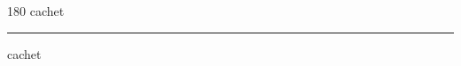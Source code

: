 
\begin{frame}
\begin{center}
\begin{turn}{180}
{\fontsize{2.5cm}{1em}\selectfont cachet}
\end{turn}
\vspace{1em}\par  
\hrule
\vspace{1em}\par  
{\fontsize{2.5cm}{1em}\selectfont cachet}
\end{center}
\end{frame}
